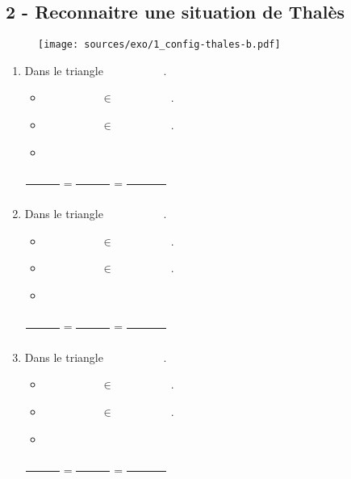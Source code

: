 \documentclass[11pt]{article}
\begin{document}

\setlength{\columnseprule}{1pt}

\subsection*{2 - Reconnaitre une situation de Thalès}

\begin{figure}[H]
  \centering
  \texttt{[image: sources/exo/1\_config-thales-b.pdf]}
\end{figure}

\begin{multicols}{3}
\begin{enumerate}

\item Dans le triangle $\phantom{1234567890}$.
  \begin{itemize}   
  \item $\phantom{1234567890} \in \phantom{1234567890}$.
  \item $\phantom{1234567890} \in \phantom{1234567890}$.
  \item \phantom{123456}
  \end{itemize}
  
  $\dfrac{\phantom{123456}}{\phantom{123456}} = \dfrac{\phantom{123456}}{\phantom{123456}} = \dfrac{\phantom{1234567}}{\phantom{123456}} $

\item Dans le triangle $\phantom{1234567890}$.
  \begin{itemize}   
  \item $\phantom{1234567890} \in \phantom{1234567890}$.
  \item $\phantom{1234567890} \in \phantom{1234567890}$.
  \item \phantom{123456}
  \end{itemize}

  $\dfrac{\phantom{123456}}{\phantom{123456}} = \dfrac{\phantom{123456}}{\phantom{123456}} = \dfrac{\phantom{1234567}}{\phantom{123456}} $

\item Dans le triangle $\phantom{1234567890}$.
  \begin{itemize}   
  \item $\phantom{1234567890} \in \phantom{1234567890}$.
  \item $\phantom{1234567890} \in \phantom{1234567890}$.
  \item \phantom{123456}
  \end{itemize}

  $\dfrac{\phantom{123456}}{\phantom{123456}} = \dfrac{\phantom{123456}}{\phantom{123456}} = \dfrac{\phantom{1234567}}{\phantom{123456}} $ 
\end{enumerate}
\end{multicols}
\end{document}
